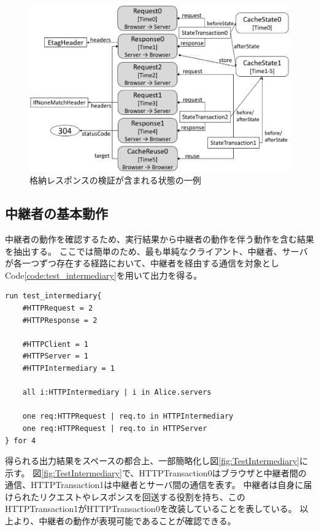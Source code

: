 \documentclass[journal]{IEEEtran}
\begin{document}
\begin{figure}[htb]
\centering
\includegraphics[width=\hsize]{./fig/TestVerification.eps}
\caption{格納レスポンスの検証が含まれる状態の一例}
\label{fig:TestVerification}
\end{figure}

\subsection{中継者の基本動作}
中継者の動作を確認するため、実行結果から中継者の動作を伴う動作を含む結果を抽出する。
ここでは簡単のため、最も単純なクライアント、中継者、サーバが各一つずつ存在する経路において、中継者を経由する通信を対象としCode\ref{code:test_intermediary}を用いて出力を得る。

\begin{lstlisting}[caption=中継者の動作, label=code:test_intermediary]
run test_intermediary{
	#HTTPRequest = 2
	#HTTPResponse = 2

	#HTTPClient = 1
	#HTTPServer = 1
	#HTTPIntermediary = 1

	all i:HTTPIntermediary | i in Alice.servers

	one req:HTTPRequest | req.to in HTTPIntermediary
	one req:HTTPRequest | req.to in HTTPServer
} for 4
\end{lstlisting}

得られる出力結果をスペースの都合上、一部簡略化し図\ref{fig:TestIntermediary}に示す。
図\ref{fig:TestIntermediary}で、HTTPTransaction0はブラウザと中継者間の通信、HTTPTransaction1は中継者とサーバ間の通信を表す。
中継者は自身に届けられたリクエストやレスポンスを回送する役割を持ち、このHTTPTransaction1がHTTPTransaction0を改装していることを表している。
以上より、中継者の動作が表現可能であることが確認できる。
\end{document}

